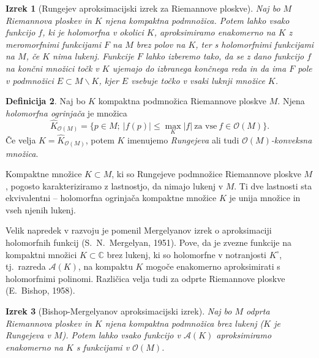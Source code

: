 \documentclass[12pt,a4paper,twoside]{article}
\theoremstyle{definition} %
\newtheorem{definicija}{Definicija}[section]
\theoremstyle{plain} %
\newtheorem{izrek}[definicija]{Izrek}
\numberwithin{equation}{section}  %
\newcommand{\C}{\mathbb C}
\begin{document}
\begin{izrek}[Rungejev aproksimacijski izrek za Riemannove ploskve] \label{izr:Runge}
Naj bo $M$ Riemannova ploskev in $K$ njena kompaktna podmnožica. 
Potem lahko vsako funkcijo $f$, ki je holomorfna v okolici $K$, aproksimiramo enakomerno na $K$ z meromorfnimi funkcijami $F$ na $M$ brez polov na $K$, ter s holomorfnimi funkcijami na $M$, če $K$ nima lukenj.
Funkcije $F$ lahko izberemo tako, da se z dano funkcijo $f$ na končni množici točk v $K$ ujemajo do izbranega končnega reda in da ima $F$ pole v podmnožici $E \subset M \backslash K$, kjer $E$ vsebuje točko v vsaki luknji množice $K$. 
\end{izrek}

\begin{definicija}
Naj bo $K$ kompaktna podmnožica Riemannove ploskve $M$. Njena \emph{holomorfna ogrinjača} je množica 
\begin{equation}
\widehat{K}_{\mathcal{O}(M)} = \{p \in M ; \ |f(p)| \leq \max_{K} |f| \ \text{za vse} \ f \in \mathcal{O}(M) \}.
\end{equation}
Če velja $K = \widehat{K}_{\mathcal{O}(M)}$, potem $K$ imenujemo \emph{Rungejeva} ali tudi \emph{$\mathcal{O}(M)$-konveksna množica}.
\end{definicija}

Kompaktne množice $K \subset M$, ki so Rungejeve podmnožice Riemannove ploskve $M$, pogosto karakteriziramo z lastnostjo, da nimajo lukenj v $M$. Ti dve lastnosti sta ekvivalentni -- holomorfna ogrinjača kompaktne množice $K$ je unija množice in vseh njenih lukenj. \newline

Velik napredek v razvoju je pomenil Mergelyanov izrek o aproksimaciji holomorfnih funkcij (S.~N.~Mergelyan, 1951). Pove, da je zvezne funkcije na kompaktni množici $K \subset \C$ brez lukenj, ki so holomorfne v notranjosti $K^{\circ}$, tj.~razreda $\mathcal{A}(K)$, na kompaktu $K$ mogoče enakomerno aproksimirati s holomorfnimi polinomi.
Različica velja tudi za odprte Riemannove ploskve (E.~Bishop, 1958).

\begin{izrek} [Bishop-Mergelyanov aproksimacijski izrek] \label{izr:Bishop-Mergelyan}
Naj bo $M$ odprta Riemannova ploskev in $K$ njena kompaktna podmnožica brez lukenj ($K$ je Rungejeva v $M$). Potem lahko vsako funkcijo v $\mathcal{A}(K)$ aproksimiramo enakomerno na $K$ s funkcijami v $\mathcal{O}(M)$.
\end{izrek}
\end{document}
